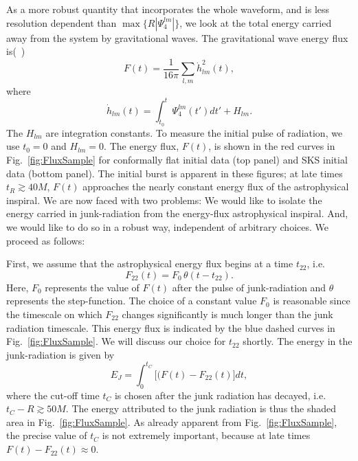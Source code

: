 As a more robust quantity that incorporates the whole waveform, and is
less resolution dependent than $\max\{R|\Psi_4^{lm}|\}$, we look at the
total energy carried away from the system by gravitational waves. The
 gravitational wave energy flux is(~\cite{Boyle:2008})
\begin{equation}
F(t) =\frac{1}{16\pi}\sum_{l,m}\dot{h}_{lm}^2(t),
\end{equation}
where
\begin{equation}
\dot{h}_{lm}(t)=\int_{t_0}^{t}{\Psi_4^{lm}(t')dt'} + H_{lm}.
\end{equation}
The $H_{lm}$ are integration constants.  To measure the
  initial pulse of radiation, we use $t_0=0$ and $H_{lm}=0$.  The energy flux, $F(t)$, is shown in
the red curves in Fig.~\ref{fig:FluxSample} for conformally flat initial data (top
panel) and SKS initial data (bottom panel).  The initial burst
  is apparent in these figures; at late times $t_R\gtrsim 40M$, $F(t)$
  approaches the nearly constant energy flux of the astrophysical
  inspiral.  We are now faced with two problems: We would like to
  isolate the energy carried in junk-radiation from the energy-flux
  astrophysical inspiral.  And, we would like to do so in a robust way, 
independent of arbitrary choices.  We
  proceed as follows:

  First, we assume that the astrophysical energy flux begins at a time
  $t_{22}$, i.e.
\begin{equation}
  F_{22}(t) = F_0\,\theta(t-t_{22}).
\end{equation}
Here, $F_0$ represents the value of $F(t)$ after the pulse of
junk-radiation and $\theta$ represents the step-function.
The choice of a constant value $F_0$ is reasonable since the
timescale on which $F_{22}$ changes significantly is much longer than
the junk radiation timescale.  This energy flux is indicated by the blue dashed curves in Fig.~\ref{fig:FluxSample}.
We will
discuss our choice for $t_{22}$ shortly.  The energy in the
junk-radiation is given by
\begin{equation}\label{eq:EJ}
E_J=\int_0^{t_C}\big[(F(t)-F_{22}(t)\big]dt,
\end{equation}
where the cut-off time $t_C$ is chosen after the junk radiation has
decayed, i.e. $t_C-R\gtrsim 50M$.  The energy attributed to the junk
radiation is thus the shaded area in Fig.~\ref{fig:FluxSample}.  As
already apparent from Fig.~\ref{fig:FluxSample}, the precise value of
$t_C$ is not extremely important, because at late times $F(t)-F_{22}(t)\approx 0$.  

